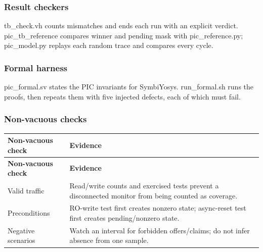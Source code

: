 \documentclass[11pt]{article}
\begin{document}
\subsubsection{Result checkers}
\noindent tb\_check.vh counts mismatches and ends each run with an explicit verdict. pic\_tb\_reference compares winner and pending mask with pic\_reference.py; pic\_model.py replays each random trace and compares every cycle.\par\medskip
\subsubsection{Formal harness}
\noindent pic\_formal.sv states the PIC invariants for SymbiYosys. run\_formal.sh runs the proofs, then repeats them with five injected defects, each of which must fail.\par\medskip
\subsubsection{Non-vacuous checks}
{\small
\begin{longtable}{@{}L{0.3200\dimexpr\linewidth-12pt\relax}L{0.6800\dimexpr\linewidth-12pt\relax}@{}}
\toprule
\textbf{Non-vacuous check} & \textbf{Evidence} \\ \midrule
\endfirsthead
\toprule
\textbf{Non-vacuous check} & \textbf{Evidence} \\ \midrule
\endhead
Valid traffic & Read/write counts and exercised tests prevent a disconnected monitor from being counted as coverage. \\ \addlinespace[3pt]
Preconditions & RO-write test first creates nonzero state; async-reset test first creates pending/nonzero state. \\ \addlinespace[3pt]
Negative scenarios & Watch an interval for forbidden offers/claims; do not infer absence from one sample. \\*
\bottomrule\end{longtable}}

\end{document}
